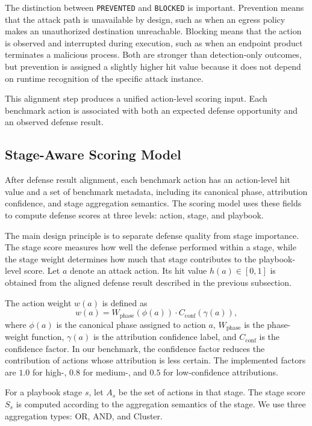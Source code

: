 The distinction between \texttt{PREVENTED} and \texttt{BLOCKED} is important. Prevention means that the attack path is unavailable by design, such as when an egress policy makes an unauthorized destination unreachable. Blocking means that the action is observed and interrupted during execution, such as when an endpoint product terminates a malicious process. Both are stronger than detection-only outcomes, but prevention is assigned a slightly higher hit value because it does not depend on runtime recognition of the specific attack instance.

This alignment step produces a unified action-level scoring input. Each benchmark action is associated with both an expected defense opportunity and an observed defense result.

\subsection{Stage-Aware Scoring Model}
\label{subsec:stage-aware-scoring}

After defense result alignment, each benchmark action has an action-level hit value and a set of benchmark metadata, including its canonical phase, attribution confidence, and stage aggregation semantics. The scoring model uses these fields to compute defense scores at three levels: action, stage, and playbook.

The main design principle is to separate defense quality from stage importance. The stage score measures how well the defense performed within a stage, while the stage weight determines how much that stage contributes to the playbook-level score. Let $a$ denote an attack action. Its hit value $h(a) \in [0,1]$ is obtained from the aligned defense result described in the previous subsection.

The action weight $w(a)$ is defined as
\[
w(a) =
W_{\mathrm{phase}}(\phi(a)) \cdot C_{\mathrm{conf}}(\gamma(a)),
\]
where $\phi(a)$ is the canonical phase assigned to action $a$, $W_{\mathrm{phase}}$ is the phase-weight function, $\gamma(a)$ is the attribution confidence label, and $C_{\mathrm{conf}}$ is the confidence factor. In our benchmark, the confidence factor reduces the contribution of actions whose attribution is less certain. The implemented factors are $1.0$ for high-, $0.8$ for medium-, and $0.5$ for low-confidence attributions.

For a playbook stage $s$, let $A_s$ be the set of actions in that stage. The stage score $S_s$ is computed according to the aggregation semantics of the stage. We use three aggregation types: OR, AND, and Cluster.

